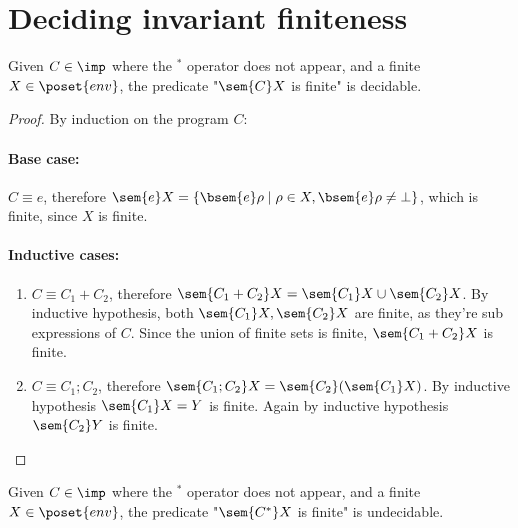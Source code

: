 \section{Deciding invariant finiteness}

\begin{lemma}\label{le:finiteness}
  Given \(C\in\imp\) where the \(^*\) operator does not appear, and a
  finite \(X \in \poset{env}\), the predicate "\(\sem{C}X\) is finite"
  is decidable.
\end{lemma}

\begin{proof}
  By induction on the program \(C\):
  \paragraph*{Base case:\\}
  \(C \equiv e\), therefore \(\sem{e}X = \{\bsem{e}\rho \mid \rho \in
  X , \bsem{e}\rho \neq \bot\}\), which is finite, since \(X\) is
  finite.
  
  \paragraph*{Inductive cases:\\}
  \begin{enumerate}
  \item \(C\equiv C_1 + C_2\), therefore \(\sem{C_1 + C_2} X =
    \sem{C_1}X \cup \sem{C_2}X\). By inductive hypothesis, both
    \(\sem{C_1}X, \sem{C_2}X\) are finite, as they're sub expressions
    of \(C\). Since the union of finite sets is finite, \(\sem{C_1 +
      C_2}X\) is finite.
  \item \(C\equiv C_1; C_2\), therefore \(\sem{C_1;C_2}X =
    \sem{C_2}(\sem{C_1}X)\). By inductive hypothesis \(\sem{C_1}X =
    Y\) is finite. Again by inductive hypothesis \(\sem{C_2}Y\) is
    finite.
  \end{enumerate}
\end{proof}

\begin{lemma}\label{le:infiniteness}
  Given \(C\in\imp\) where the \(^*\) operator does not appear, and a
  finite \(X \in \poset{env}\), the predicate "\(\sem{C^*}X\) is
  finite" is undecidable.
\end{lemma}


